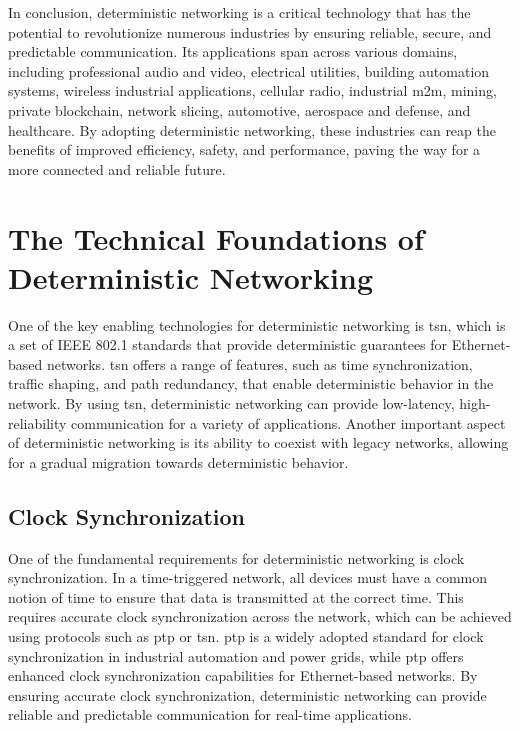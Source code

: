 \documentclass[runningheads]{llncs}
\begin{document}
In conclusion, deterministic networking is a critical technology that has the potential to revolutionize numerous industries by ensuring reliable, secure, and predictable communication. Its applications span across various domains, including professional audio and video, electrical utilities, building automation systems, wireless industrial applications, cellular radio, industrial \gls{m2m}, mining, private blockchain, network slicing, automotive, aerospace and defense, and healthcare. By adopting deterministic networking, these industries can reap the benefits of improved efficiency, safety, and performance, paving the way for a more connected and reliable future.

\section{The Technical Foundations of Deterministic Networking}
One of the key enabling technologies for deterministic networking is \gls{tsn}, which is a set of IEEE 802.1 standards that provide deterministic guarantees for Ethernet-based networks. \gls{tsn} offers a range of features, such as time synchronization, traffic shaping, and path redundancy, that enable deterministic behavior in the network. By using \gls{tsn}, deterministic networking can provide low-latency, high-reliability communication for a variety of applications. Another important aspect of deterministic networking is its ability to coexist with legacy networks, allowing for a gradual migration towards deterministic behavior.

\subsection*{Clock Synchronization}
One of the fundamental requirements for deterministic networking is clock synchronization. In a time-triggered network, all devices must have a common notion of time to ensure that data is transmitted at the correct time. This requires accurate clock synchronization across the network, which can be achieved using protocols such as \gls{ptp} or \gls{tsn}. \gls{ptp} is a widely adopted standard for clock synchronization in industrial automation and power grids, while \gls{ptp} offers enhanced clock synchronization capabilities for Ethernet-based networks. By ensuring accurate clock synchronization, deterministic networking can provide reliable and predictable communication for real-time applications.
\end{document}
